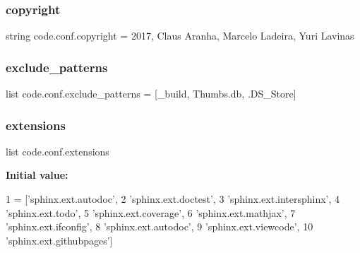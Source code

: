 \mbox{\label{namespacecode_1_1conf_a95486e8c49b3f17017a5ba7070f6d2dd}} 
\subsubsection{\texorpdfstring{copyright}{copyright}}
{\footnotesize\ttfamily string code.\+conf.\+copyright = \textquotesingle{}2017, Claus Aranha, Marcelo Ladeira, Yuri Lavinas\textquotesingle{}}

\mbox{\label{namespacecode_1_1conf_abe586505ba27e47e1cc625178fa5c996}} 
\subsubsection{\texorpdfstring{exclude\+\_\+patterns}{exclude\_patterns}}
{\footnotesize\ttfamily list code.\+conf.\+exclude\+\_\+patterns = \mbox{[}\textquotesingle{}\+\_\+build\textquotesingle{}, \textquotesingle{}Thumbs.\+db\textquotesingle{}, \textquotesingle{}.D\+S\+\_\+\+Store\textquotesingle{}\mbox{]}}

\mbox{\label{namespacecode_1_1conf_a5d4845438e0576cf40e273c949398b6a}} 
\subsubsection{\texorpdfstring{extensions}{extensions}}
{\footnotesize\ttfamily list code.\+conf.\+extensions}

{\bfseries Initial value\+:}
\begin{DoxyCode}
1 =  [\textcolor{stringliteral}{'sphinx.ext.autodoc'},
2     \textcolor{stringliteral}{'sphinx.ext.doctest'},
3     \textcolor{stringliteral}{'sphinx.ext.intersphinx'},
4     \textcolor{stringliteral}{'sphinx.ext.todo'},
5     \textcolor{stringliteral}{'sphinx.ext.coverage'},
6     \textcolor{stringliteral}{'sphinx.ext.mathjax'},
7     \textcolor{stringliteral}{'sphinx.ext.ifconfig'},
8     \textcolor{stringliteral}{'sphinx.ext.autodoc'},
9     \textcolor{stringliteral}{'sphinx.ext.viewcode'},
10     \textcolor{stringliteral}{'sphinx.ext.githubpages'}]
\end{DoxyCode}
\mbox{\label{namespacecode_1_1conf_a93c108ad7db4dd2c7ddaf8db952d92c1}} 
